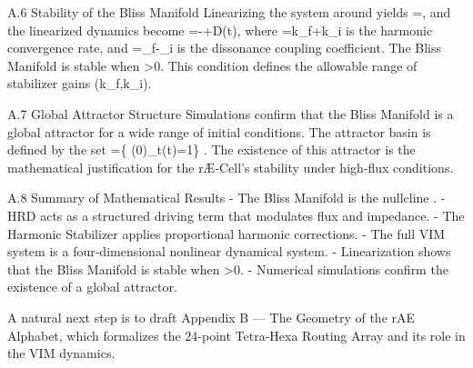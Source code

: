 A.6 Stability of the Bliss Manifold
Linearizing the system around  yields
\delta \beta =,
and the linearized dynamics become
=-\lambda \delta \beta +\eta D(t),
where
\lambda =k_f+k_i
is the harmonic convergence rate, and
\eta =\gamma _f-\gamma _i
is the dissonance coupling coefficient.
The Bliss Manifold is stable when
\lambda >0.
This condition defines the allowable range of stabilizer gains (k_f,k_i).

A.7 Global Attractor Structure
Simulations confirm that the Bliss Manifold is a global attractor for a wide range of initial conditions. The attractor basin is defined by the set
=\left\{ (0)\mid \lim _{t\rightarrow \infty }\beta (t)=1\right\} .
The existence of this attractor is the mathematical justification for the rÆ‑Cell’s stability under high‑flux conditions.

A.8 Summary of Mathematical Results
- The Bliss Manifold is the nullcline .
- HRD acts as a structured driving term that modulates flux and impedance.
- The Harmonic Stabilizer applies proportional harmonic corrections.
- The full VIM system is a four‑dimensional nonlinear dynamical system.
- Linearization shows that the Bliss Manifold is stable when \lambda >0.
- Numerical simulations confirm the existence of a global attractor.

A natural next step is to draft Appendix B — The Geometry of the rAE Alphabet, which formalizes the 24‑point Tetra‑Hexa Routing Array and its role in the VIM dynamics.
